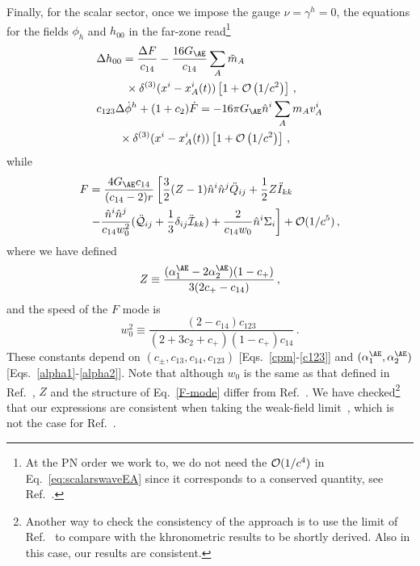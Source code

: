 \documentclass[prd,aps,twocolumn,nofootinbib,showpacs,superscriptaddress]{revtex4-1}
\newcommand\be{\begin{equation}}
\newcommand\ee{\end{equation}}
\newcommand{\nn}{\nonumber}
\begin{document}
Finally, for the scalar sector, once we impose the gauge $\nu=\gamma^h=0$, the equations for the
fields $\phi_h$ and $h_{00}$ in the far-zone read\footnote{At the PN order we work to, we do not need the ${\cal O}(1/c^4)$  in Eq.~\eqref{eq:scalarswaveEA} since it corresponds to a conserved  quantity, see Ref.~\cite{Foster:2007gr}.} 
\begin{align}
\label{eq:scalarswaveEA}
&\Delta h_{00} =\frac{\Delta F}{c_{14}}-\frac{16 G_{\AE}}{c_{14}} \sum_A \tilde m_A  
\nonumber \\ 
&\qquad \; \;
\times \delta^{(3)}(x^i-x^i_A(t)) \left[1+{\cal{O}}\left({1}/{c^{2}}\right)\right]\,,
\\
&c_{123}\Delta \dot \phi^h+(1+c_2)\dot F=-16 \pi G_{\AE} \hat n^i\sum_A m_A  v^i_A
\nonumber \\
&\quad \quad \times \delta^{(3)} (x^i-x^i_A(t)) \left[ 1 + {\cal{O}} \left({1}/{c^{2}} \right)\right]\,,  
\end{align}
 while
\begin{align}
\label{F-mode}
F&=\frac{4 G_{\AE} c_{14}}{(c_{14}-2)r}\left[\frac{3}{2}(Z-1) \hat n^i 
\hat n^j \ddot Q_{ij}+\frac{1}{2} Z \ddot I_{kk} \right.  \nn \\ &\left.
-\frac{\hat n^i\hat n^j}{c_{14} w_0^2}(\ddot{\cal Q}_{ij}+\frac{1}{3}
\delta_{ij}\ddot{\cal I}_{kk})+\frac{2}{c_{14} w_0} \hat n^i
\Sigma_i\right]+{\cal O}(1/c^{5})\,,
\end{align}
where we have defined
\be 
\label{Z-def}
Z \equiv \frac{(\alpha^{\AE}_1-2\alpha^{\AE}_2)(1-c_+)}{3(2c_+-c_{14})}\,,
\ee
and the speed of the $F$ mode is
\be
\label{w0-def}
w_0^2 \equiv \frac{(2-c_{14}) c_{123}}{(2+3c_2+c_{+}) (1-c_{+}) c_{14}}\,.
\ee
These constants depend on $(c_{\pm},c_{13},c_{14},c_{123})$ [Eqs.~\eqref{cpm}-\eqref{c123}]
and $(\alpha_{1}^{\AE},\alpha_{2}^{\AE})$ [Eqs.~\eqref{alpha1}-\eqref{alpha2}]. 
Note that although $w_{0}$ is the same as that defined in Ref.~\cite{Foster:2005dk,Foster:2006az,Foster:2007gr},
$Z$ and the structure of Eq.~\eqref{F-mode} differ from Ref.~\cite{Foster:2006az,Foster:2007gr}. We have checked\footnote{Another way to check the 
consistency of the approach is to use the limit of Ref.~\cite{Jacobson:2013xta} to compare with the khronometric results to be shortly derived. Also 
in this case, our results are consistent.} that our 
expressions are consistent when taking the weak-field limit~\cite{Foster:2006az}, which is not the case for Ref.~\cite{Foster:2007gr}.
\end{document}
